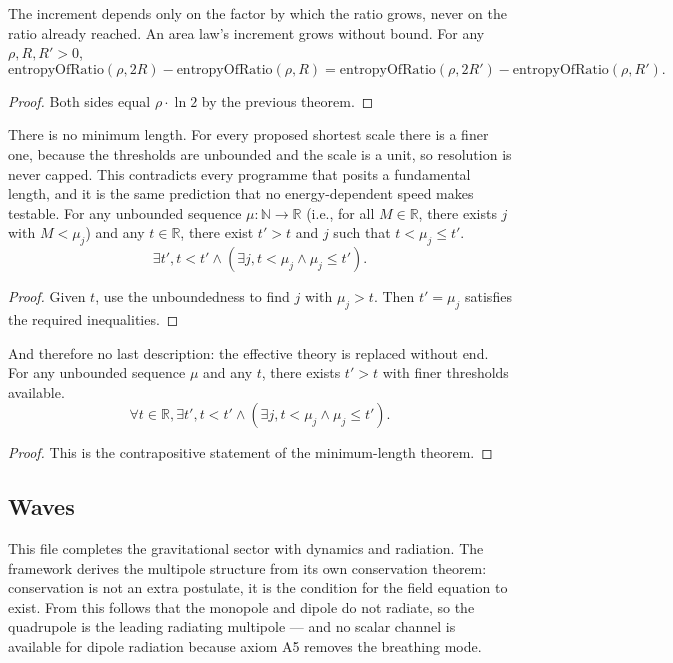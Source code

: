 \begin{theorem}
The increment depends only on the factor by which the ratio grows, never on the ratio already reached. An area law's increment grows without bound. For any $\rho, R, R' > 0$,
\[
\text{entropyOfRatio}(\rho, 2R) - \text{entropyOfRatio}(\rho, R) = \text{entropyOfRatio}(\rho, 2R') - \text{entropyOfRatio}(\rho, R').
\]
\begin{proof}
Both sides equal $\rho \cdot \ln 2$ by the previous theorem.
\end{proof}
\end{theorem}

\begin{theorem}
There is no minimum length. For every proposed shortest scale there is a finer one, because the thresholds are unbounded and the scale is a unit, so resolution is never capped. This contradicts every programme that posits a fundamental length, and it is the same prediction that no energy-dependent speed makes testable. For any unbounded sequence $\mu : \mathbb{N} \to \mathbb{R}$ (i.e., for all $M \in \mathbb{R}$, there exists $j$ with $M < \mu_j$) and any $t \in \mathbb{R}$, there exist $t' > t$ and $j$ such that $t < \mu_j \leq t'$.
\[
\exists t', t < t' \wedge (\exists j, t < \mu_j \wedge \mu_j \leq t').
\]
\begin{proof}
Given $t$, use the unboundedness to find $j$ with $\mu_j > t$. Then $t' = \mu_j$ satisfies the required inequalities.
\end{proof}
\end{theorem}

\begin{theorem}
And therefore no last description: the effective theory is replaced without end. For any unbounded sequence $\mu$ and any $t$, there exists $t' > t$ with finer thresholds available.
\[
\forall t \in \mathbb{R}, \exists t', t < t' \wedge (\exists j, t < \mu_j \wedge \mu_j \leq t').
\]
\begin{proof}
This is the contrapositive statement of the minimum-length theorem.
\end{proof}
\end{theorem}

\subsection{Waves}

This file completes the gravitational sector with dynamics and radiation. The framework derives the multipole structure from its own conservation theorem: conservation is not an extra postulate, it is the condition for the field equation to exist. From this follows that the monopole and dipole do not radiate, so the quadrupole is the leading radiating multipole — and no scalar channel is available for dipole radiation because axiom A5 removes the breathing mode.

